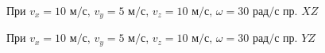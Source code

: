\documentclass[a5paper, 10pt]{article}
\theoremstyle{definition}
\theoremstyle{plain}
\theoremstyle{remark}
\begin{document}
\begin{figure}[!h]
	           \caption{При $v_x = 10 \text{ м/с}, \, v_y = 5  \text{ м/с}, \, v_z = 10  \text{ м/с}, \, \omega = 30 \text{ рад/с}$ пр. $XZ$}
\end{figure}

\begin{figure}[!h]
	           \caption{При $v_x = 10 \text{ м/с}, \, v_y = 5  \text{ м/с}, \, v_z = 10  \text{ м/с}, \, \omega = 30 \text{ рад/с}$ пр. $YZ$}
\end{figure}
\end{document}
